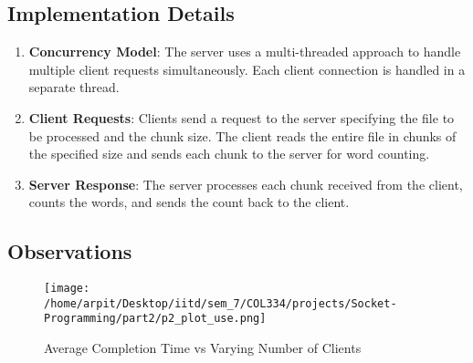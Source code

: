 \documentclass[12pt]{article}
\begin{document}
\subsection{Implementation Details}
\begin{enumerate}
    \item \textbf{Concurrency Model}: The server uses a multi-threaded approach to handle multiple client requests simultaneously. Each client connection is handled in a separate thread.
    \item \textbf{Client Requests}: Clients send a request to the server specifying the file to be processed and the chunk size. The client reads the entire file in chunks of the specified size and sends each chunk to the server for word counting.
    \item \textbf{Server Response}: The server processes each chunk received from the client, counts the words, and sends the count back to the client.
\end{enumerate}

\subsection{Observations}

\begin{figure}[h!]
    \centering
    \texttt{[image: /home/arpit/Desktop/iitd/sem\_7/COL334/projects/Socket-Programming/part2/p2\_plot\_use.png]}
    \caption{Average Completion Time vs Varying Number of Clients}
    \label{fig:part2_output}
\end{figure}
\end{document}
